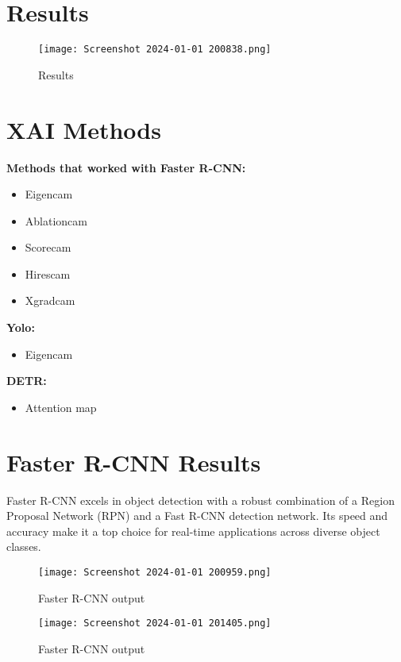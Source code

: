 \documentclass{article}
\begin{document}
\section{Results}

\begin{figure}[H]
  \centering
  \texttt{[image: Screenshot 2024-01-01 200838.png]} %
  \caption{Results}
  \label{fig:example}
\end{figure}

\section{XAI Methods}

\textbf{Methods that worked with Faster R-CNN:}
\begin{itemize}
    \item Eigencam
    \item Ablationcam
    \item Scorecam
    \item Hirescam
    \item Xgradcam
\end{itemize}

\textbf{Yolo:}
\begin{itemize}
    \item Eigencam
\end{itemize}

\textbf{DETR:}
\begin{itemize}
    \item Attention map
\end{itemize}


\section{Faster R-CNN Results}


Faster R-CNN excels in object detection with a robust combination of a Region Proposal Network (RPN) and a Fast R-CNN detection network. Its speed and accuracy make it a top choice for real-time applications across diverse object classes.

\begin{figure}[H]
  \centering
  \texttt{[image: Screenshot 2024-01-01 200959.png]} %
  \caption{Faster R-CNN output}
  \label{fig:example}
\end{figure}


\begin{figure}[H]
  \centering
  \texttt{[image: Screenshot 2024-01-01 201405.png]} %
  \caption{Faster R-CNN output}
  \label{fig:example}
\end{figure}
\end{document}
